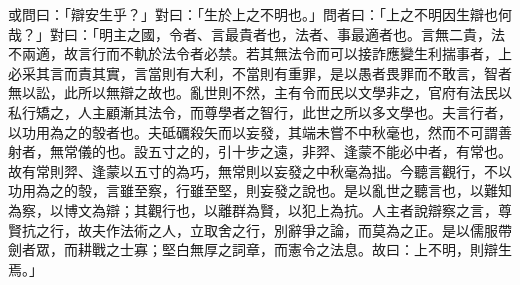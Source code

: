 
\begin{pinyinscope}
或問曰：「辯安生乎？」對曰：「生於上之不明也。」問者曰：「上之不明因生辯也何哉？」對曰：「明主之國，令者、言最貴者也，法者、事最適者也。言無二貴，法不兩適，故言行而不軌於法令者必禁。若其無法令而可以接詐應變生利揣事者，上必采其言而責其實，言當則有大利，不當則有重罪，是以愚者畏罪而不敢言，智者無以訟，此所以無辯之故也。亂世則不然，主有令而民以文學非之，官府有法民以私行矯之，人主顧漸其法令，而尊學者之智行，此世之所以多文學也。夫言行者，以功用為之的彀者也。夫砥礪殺矢而以妄發，其端未嘗不中秋毫也，然而不可謂善射者，無常儀的也。設五寸之的，引十步之遠，非羿、逢蒙不能必中者，有常也。故有常則羿、逢蒙以五寸的為巧，無常則以妄發之中秋毫為拙。今聽言觀行，不以功用為之的彀，言雖至察，行雖至堅，則妄發之說也。是以亂世之聽言也，以難知為察，以博文為辯；其觀行也，以離群為賢，以犯上為抗。人主者說辯察之言，尊賢抗之行，故夫作法術之人，立取舍之行，別辭爭之論，而莫為之正。是以儒服帶劍者眾，而耕戰之士寡；堅白無厚之詞章，而憲令之法息。故曰：上不明，則辯生焉。」


\end{pinyinscope}